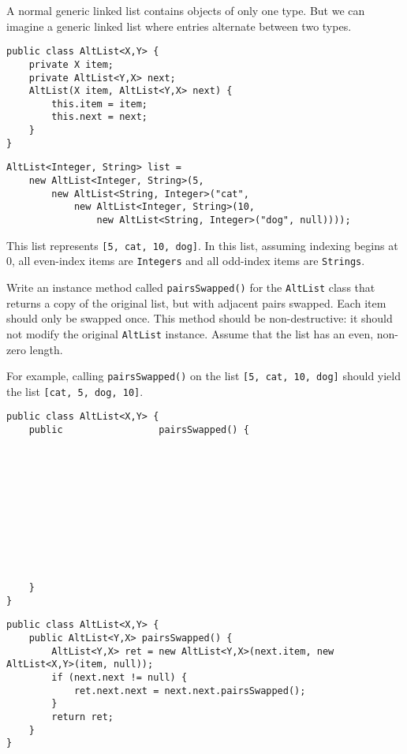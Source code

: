 \begin{blocksection}
\question A normal generic linked list contains objects of only one type. But
we can imagine a generic linked list where entries alternate between two types.

\begin{lstlisting}
public class AltList<X,Y> {
    private X item;
    private AltList<Y,X> next;
    AltList(X item, AltList<Y,X> next) {
        this.item = item;
        this.next = next;
    }
}
\end{lstlisting}

\begin{lstlisting}
AltList<Integer, String> list =
    new AltList<Integer, String>(5,
        new AltList<String, Integer>("cat",
            new AltList<Integer, String>(10,
                new AltList<String, Integer>("dog", null))));
\end{lstlisting}

This list represents \lstinline$[5, cat, 10, dog]$. In this list, assuming
indexing begins at 0, all even-index items are \lstinline$Integers$ and all
odd-index items are \lstinline$Strings$.

Write an instance method called \lstinline$pairsSwapped()$ for the
\lstinline$AltList$ class that returns a copy of the original list, but with
adjacent pairs swapped. Each item should only be swapped once. This method
should be non-destructive: it should not modify the original
\lstinline$AltList$ instance. Assume that the list has an even, non-zero
length.

For example, calling \lstinline$pairsSwapped()$ on the list \lstinline$[5, cat,
10, dog]$ should yield the list \lstinline$[cat, 5, dog, 10]$.

\ifprintanswers\else
\begin{lstlisting}
public class AltList<X,Y> {
    public                 pairsSwapped() {











    }
}
\end{lstlisting}
\fi

\begin{solution}
\begin{lstlisting}
public class AltList<X,Y> {
    public AltList<Y,X> pairsSwapped() {
        AltList<Y,X> ret = new AltList<Y,X>(next.item, new AltList<X,Y>(item, null));
        if (next.next != null) {
            ret.next.next = next.next.pairsSwapped();
        }
        return ret;
    }
}
\end{lstlisting}
\end{solution}
\end{blocksection}
